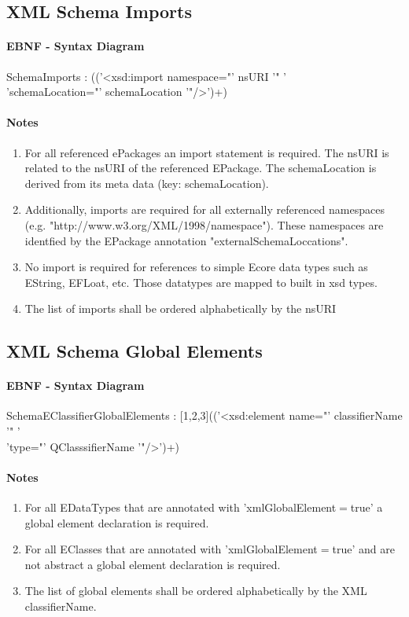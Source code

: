 \documentclass[11pt,a4paper]{article}
\begin{document}
\subsection{XML Schema Imports}
\paragraph{EBNF - Syntax Diagram}
\begin{rail}
SchemaImports : 
(('<xsd:import namespace="' nsURI '" '\\ 
 'schemaLocation="' schemaLocation '"/>')+)
\end{rail}
\paragraph{Notes}
\begin{enumerate}
\item For all referenced ePackages an import statement is required. The nsURI is related to the nsURI of the referenced EPackage. The schemaLocation is derived from its meta data (key: schemaLocation). 
\item Additionally, imports are required for all externally referenced namespaces (e.g. "http://www.w3.org/XML/1998/namespace"). These namespaces are identfied by the EPackage annotation "externalSchemaLoccations".
\item No import is required for references to simple Ecore data types such as EString, EFLoat, etc. Those datatypes are mapped to built in xsd types.
\item The list of imports shall be ordered alphabetically by the nsURI
\end{enumerate}

\subsection{XML Schema Global Elements}
\paragraph{EBNF - Syntax Diagram}
\begin{rail}
SchemaEClassifierGlobalElements : 
[1,2,3](('<xsd:element name="' classifierName '" '\\ 
 'type="' QClasssifierName '"/>')+)
\end{rail}
\paragraph{Notes}
\begin{enumerate}
\item For all EDataTypes that are annotated with 'xmlGlobalElement$=$true' a global element declaration is required.
\item For all EClasses that are annotated with 'xmlGlobalElement$=$true' and are not abstract a global element declaration is required.
\item The list of global elements shall be ordered alphabetically by the XML classifierName.
\end{enumerate}
\end{document}
